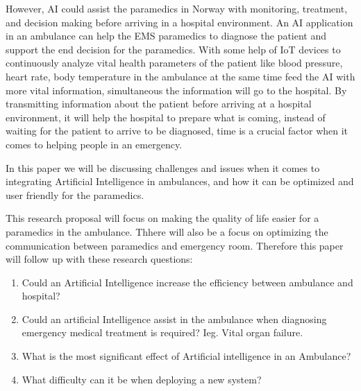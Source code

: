 \documentclass[fleqn,10pt]{wlscirep}
\begin{document}
However, AI could assist the paramedics in Norway with monitoring, treatment, and decision making before arriving in a hospital environment. An AI application in an ambulance can help the EMS paramedics to diagnose the patient and support the end decision for the paramedics. With some help of IoT devices to continuously analyze vital health parameters of the patient like blood pressure, heart rate, body temperature in the ambulance at the same time feed the AI with more vital information, simultaneous the information will go to the hospital. By transmitting information about the patient before arriving at a hospital environment, it will help the hospital to prepare what is coming, instead of waiting for the patient to arrive to be diagnosed, time is a crucial factor when it comes to helping people in an emergency. 

In this paper we will be discussing challenges and issues when it comes to integrating Artificial Intelligence in ambulances, and how it can be optimized and user friendly for the paramedics. 

 This research proposal will focus on making the quality of life easier for a paramedics in the ambulance. Thhere will also be a focus on optimizing the communication between paramedics and emergency room.  Therefore this paper will follow up with these research questions: 
 
\begin{enumerate}[label=(\alph*)]
 \item Could an Artificial Intelligence increase the efficiency between ambulance and hospital? 
 \item Could an artificial Intelligence assist in the ambulance when diagnosing emergency medical treatment is required? Ieg. Vital organ failure. 
 \item  What is the most significant effect of Artificial intelligence in an Ambulance? 
 \item What difficulty can it be when deploying a new system?
\end{enumerate}
 
\end{document}
